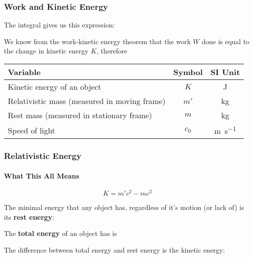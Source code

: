 \documentclass[12pt,compress,aspectratio=169]{beamer}
\newcommand{\eq}[2]{\vspace{#1}{\Large\begin{displaymath}#2\end{displaymath}}}
\begin{document}
\begin{frame}
  \frametitle{Work and Kinetic Energy}

  The integral gives us this expression:
  
  \eq{-.15in}{
    W=\gamma mc^2-mc^2 = K
  }

  \vspace{-.15in}We know from the work-kinetic energy theorem that the work $W$
  done is equal to the change in kinetic energy $K$, therefore
  
  \eq{-.2in}{ \boxed{K=m'c^2-mc^2} }

  \vspace{-.1in}
  \begin{center}
    \begin{tabular}{l|c|c}
      \rowcolor{pink}
      \textbf{Variable} & \textbf{Symbol} & \textbf{SI Unit}\\ \hline
      Kinetic energy of an object & $K$  & \si{\joule}\\
      Relativistic mass (measured in moving frame) & $m'$ & \si{\kilo\gram}\\
      Rest mass (measured in stationary frame) & $m$  & \si{\kilo\gram}\\
      Speed of light              & $c_0$ & \si{\metre\per\second}
    \end{tabular}
  \end{center}
\end{frame}

\begin{frame}
  \frametitle{Relativistic Energy}
  \framesubtitle{What This All Means}
  {\Large
    \begin{displaymath}
      \boxed{K=m'c^2-mc^2}
    \end{displaymath}
  }

  The minimal energy that any object has, regardless of it's motion (or lack
  of) is its \textbf{rest energy}:
  
  \eq{-.4in}{ E_0=mc^2 }

  \vspace{-.2in}The \textbf{total energy} of an object has is
    
  \eq{-.3in}{
    E_T=m'c^2=\gamma mc^2
  }

  \vspace{-.2in}The difference between total energy and rest energy is the
  kinetic energy:

  \eq{-.3in}{
    K=E_T-E_0
  }
\end{frame}
\end{document}
